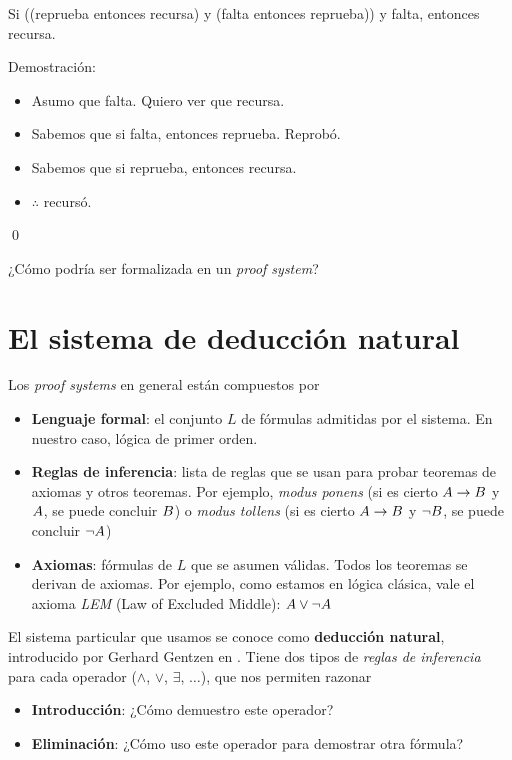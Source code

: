 \begin{ejemplo}\label{nd:ex:exam}
    Si ((reprueba entonces recursa) y (falta entonces reprueba)) y falta, entonces recursa.

    Demostración:
\begin{itemize}
    \item Asumo que falta. Quiero ver que recursa.
    \item Sabemos que si falta, entonces reprueba. Reprobó.
    \item Sabemos que si reprueba, entonces recursa.
    \item $\therefore$ recursó.
\end{itemize}
    \qed
\end{ejemplo}

¿Cómo podría ser formalizada en un \textit{proof system}?

\section{El sistema de deducción natural}

Los \textit{proof systems} en general están compuestos por

\begin{itemize}
    \item \textbf{Lenguaje formal}: el conjunto $L$ de fórmulas admitidas por
    el sistema. En nuestro caso, lógica de primer orden.
    \item \textbf{Reglas de inferencia}: lista de reglas que se usan para probar
    teoremas de axiomas y otros teoremas. Por ejemplo, \textit{modus ponens} (si
    es cierto $A \to B$ y $A$, se puede concluir $B$) o
    \textit{modus tollens} (si es cierto $A \to B$ y $\neg
    B$, se puede concluir $\neg A$)
    \item \textbf{Axiomas}: fórmulas de $L$ que se asumen válidas. Todos los
    teoremas se derivan de axiomas. Por ejemplo, como estamos en lógica clásica,
    vale el axioma \textit{LEM} (Law of Excluded Middle): $A \vee \neg A$
\end{itemize}

El sistema particular que usamos se conoce como \textbf{deducción natural},
introducido por Gerhard Gentzen en \cite{gentzen-1935} .
Tiene dos tipos de \textit{reglas de inferencia} para cada operador ($\wedge$,
$\vee$, $\exists$, $\dots$), que nos permiten razonar

\begin{itemize}
    \item \textbf{Introducción}: ¿Cómo demuestro este operador?
    \item \textbf{Eliminación}: ¿Cómo uso este operador para demostrar otra fórmula?
\end{itemize}

